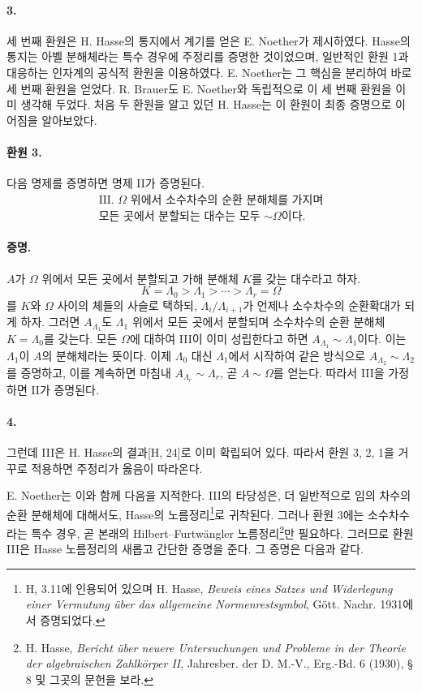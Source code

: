 \paragraph{3.}
세 번째 환원은 H. Hasse의 통지에서 계기를 얻은 E. Noether가 제시하였다. Hasse의 통지는 아벨 분해체라는 특수 경우에 주정리를 증명한 것이었으며, 일반적인 환원 1과 대응하는 인자계의 공식적 환원을 이용하였다. E. Noether는 그 핵심을 분리하여 바로 세 번째 환원을 얻었다. R. Brauer도 E. Noether와 독립적으로 이 세 번째 환원을 이미 생각해 두었다. 처음 두 환원을 알고 있던 H. Hasse는 이 환원이 최종 증명으로 이어짐을 알아보았다.

\paragraph{환원 3.}
다음 명제를 증명하면 명제 II가 증명된다.
\[
\begin{gathered}
\text{III. \(\Omega\) 위에서 소수차수의 순환 분해체를 가지며}\\
\text{모든 곳에서 분할되는 대수는 모두 \(\sim\Omega\)이다.}
\end{gathered}
\]

\paragraph{증명.}
\(A\)가 \(\Omega\) 위에서 모든 곳에서 분할되고 가해 분해체 \(K\)를 갖는 대수라고 하자.
\[
K=\Lambda_0>\Lambda_1>\cdots>\Lambda_r=\Omega
\]
를 \(K\)와 \(\Omega\) 사이의 체들의 사슬로 택하되, \(\Lambda_i/\Lambda_{i+1}\)가 언제나 소수차수의 순환확대가 되게 하자. 그러면 \(A_{\Lambda_1}\)도 \(\Lambda_1\) 위에서 모든 곳에서 분할되며 소수차수의 순환 분해체 \(K=\Lambda_0\)를 갖는다. 모든 \(\Omega\)에 대하여 III이 이미 성립한다고 하면 \(A_{\Lambda_1}\sim\Lambda_1\)이다. 이는 \(\Lambda_1\)이 \(A\)의 분해체라는 뜻이다. 이제 \(\Lambda_0\) 대신 \(\Lambda_1\)에서 시작하여 같은 방식으로 \(A_{\Lambda_2}\sim\Lambda_2\)를 증명하고, 이를 계속하면 마침내 \(A_{\Lambda_r}\sim\Lambda_r\), 곧 \(A\sim\Omega\)를 얻는다. 따라서 III을 가정하면 II가 증명된다.

\paragraph{4.}
그런데 III은 H. Hasse의 결과[H, 24]로 이미 확립되어 있다. 따라서 환원 3, 2, 1을 거꾸로 적용하면 주정리가 옳음이 따라온다.

E. Noether는 이와 함께 다음을 지적한다. III의 타당성은, 더 일반적으로 임의 차수의 순환 분해체에 대해서도, Hasse의 노름정리\footnote{\label{fn:p38-hasse-normensatz}H, 3.11에 인용되어 있으며 H. Hasse, \emph{Beweis eines Satzes und Widerlegung einer Vermutung über das allgemeine Normenrestsymbol}, Gött. Nachr. 1931에서 증명되었다.}로 귀착된다. 그러나 환원 3에는 소수차수라는 특수 경우, 곧 본래의 Hilbert--Furtwängler 노름정리\footnote{H. Hasse, \emph{Bericht über neuere Untersuchungen und Probleme in der Theorie der algebraischen Zahlkörper II}, Jahresber. der D. M.-V., Erg.-Bd. 6 (1930), § 8 및 그곳의 문헌을 보라.}만 필요하다. 그러므로 환원 III은 Hasse 노름정리의 새롭고 간단한 증명을 준다. 그 증명은 다음과 같다.

